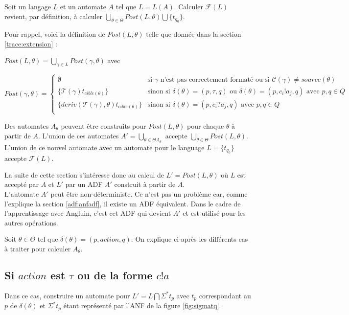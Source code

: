 Soit un langage $L$ et un automate $A$ tel que $L=L(A)$. Calculer $\mathcal{F}(L)$ revient, par définition, à calculer $\bigcup_{\theta\in\Theta}Post(L,\theta)\bigcup \{t_{q_0}\}$.

Pour rappel, voici la définition de $Post(L, \theta)$ telle que donnée dans la section \ref{trace:extension} :

$Post(L,\theta)=\bigcup_{\gamma\in L} Post(\gamma,\theta)$ avec

$$
Post(\gamma,\theta) = \left\{ \begin{array}{ll}
    \emptyset & \text{si } \gamma \text{ n'est pas correctement formaté ou si } \mathcal{C}(\gamma)\neq source(\theta)\\
    \{\mathcal{T}(\gamma)t_{cible(\theta)}\} & \text{sinon si }\delta(\theta)=(p,\tau,q) \text{ ou } \delta(\theta)=(p,c_i!a_j,q) \text{ avec }p,q\in Q\\
    \{deriv(\mathcal{T}(\gamma),\theta)t_{cible(\theta)}\}& \text{sinon si } \delta(\theta)=(p,c_i?a_j,q) \text{ avec }p,q\in Q \\
    \end{array} \right.
$$

Des automates $A_\theta$ peuvent être construits pour $Post(L,\theta)$ pour chaque $\theta$ à partir de $A$. L'union de ces automates $A'=\bigcup_{\theta \in \Theta A_\theta}$ accepte $\bigcup_{\theta\in\Theta}Post(L,\theta)$. L'union de ce nouvel automate avec un automate pour le language $L=\{t_{q_0}\}$ accepte $\mathcal{F}(L)$.

La suite de cette section s'intéresse donc au calcul de $L'= Post(L,\theta)$ où $L$ est accepté par $A$ et $L'$ par un ADF $A'$ construit à partir de $A$.\\

L'automate $A'$ peut être non-déterministe. Ce n'est pas un problème car, comme l'explique la section \ref{adf:anfadf}, il existe un ADF équivalent. Dans le cadre de l'apprentissage avec Angluin, c'est cet ADF qui devient $A'$ et est utilisé pour les autres opérations.


Soit $\theta\in\Theta$ tel que $\delta(\theta)=(p,action,q)$. On explique ci-après les différents cas à traiter pour calculer $A_\theta$.

\subsection{Si $action$ est $\tau$ ou de la forme $c!a$}

Dans ce cas, construire un automate pour $L'=L\bigcap\Sigma^*t_p$ avec $t_p$ correspondant au $p$ de $\delta(\theta)$ et $\Sigma^*t_p$ étant représenté par l'ANF de la figure \ref{fig:sigmatq}.

